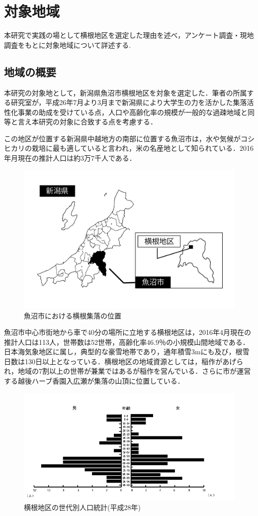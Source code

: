 \documentclass[a4paper]{jsarticle}
\begin{document}
\newpage
\section{対象地域}
本研究で実践の場として横根地区を選定した理由を述べ，アンケート調査・現地調査をもとに対象地域について詳述する.
\subsection{地域の概要}
本研究の対象地として，新潟県魚沼市横根地区を対象を選定した．筆者の所属する研究室が，平成26年7月より3月まで新潟県により大学生の力を活かした集落活性化事業の助成を受けている点，人口や高齢化率の規模が一般的な過疎地域と同等と言え本研究の対象に合致する点を考慮する．\par
この地区が位置する新潟県中越地方の南部に位置する魚沼市は，水や気候がコシヒカリの栽培に最も適していると言われ，米の名産地として知られている．2016年月現在の推計人口は約3万7千人である．\par
\begin{figure}[H]
  \begin{center}
    \includegraphics[width=0.7\hsize]{./images/yokone_place.pdf}
    \caption{魚沼市における横根集落の位置}
    \label{fig:tmu_hino}
  \end{center}
\end{figure}
魚沼市中心市街地から車で40分の場所に立地する横根地区は，2016年4月現在の推計人口は113人，世帯数は52世帯，高齢化率46.9％の小規模山間地域である．日本海気象地区に属し，典型的な豪雪地帯であり，通年積雪3mにも及び，根雪日数は130日以上となっている．横根地区の地域資源としては，稲作があげられ，地域の7割以上の世帯が兼業ではあるが稲作を営んでいる．さらに市が運営する越後ハーブ香園入広瀬が集落の山頂に位置している．\par
\begin{figure}[H]
  \begin{center}
    \includegraphics[width=0.9\hsize]{./images/zinnkou.jpg}
    \caption{横根地区の世代別人口統計(平成28年)}
    \label{fig:tmu_hino}
  \end{center}
\end{figure}
\end{document}
